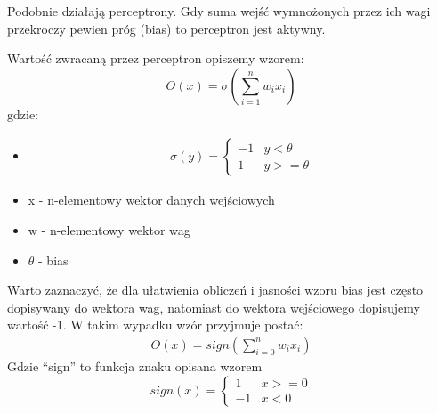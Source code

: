 \documentclass{article}
\begin{document}
Podobnie działają perceptrony.
Gdy suma wejść wymnożonych przez ich wagi przekroczy pewien próg (bias) to perceptron jest aktywny.

Wartość zwracaną przez perceptron opiszemy wzorem:
\begin{equation*}
    O(x)=\sigma(\sum\limits_{i=1}^{n}{w_i x_i})
\end{equation*}
gdzie:
\begin{itemize}
    \item
          \begin{align*}
              \sigma(y)=
              \begin{cases}
                  -1 & y<\theta  \\
                  1  & y>=\theta
              \end{cases}
          \end{align*}
    \item x - n-elementowy wektor danych wejściowych
    \item w - n-elementowy wektor wag
    \item $\theta$ - bias
\end{itemize}

Warto zaznaczyć, że dla ułatwienia obliczeń i jasności wzoru bias jest często dopisywany do wektora wag, natomiast do wektora wejściowego dopisujemy wartość -1.
W takim wypadku wzór przyjmuje postać:
\begin{align*}
    O(x)=sign(\sum\limits_{i=0}^{n}{w_i x_i})
\end{align*}
Gdzie ``sign'' to funkcja znaku opisana wzorem
\begin{equation*}
    sign(x)=\begin{cases}
        1  & x>=0 \\
        -1 & x<0
    \end{cases}
\end{equation*}
\end{document}
